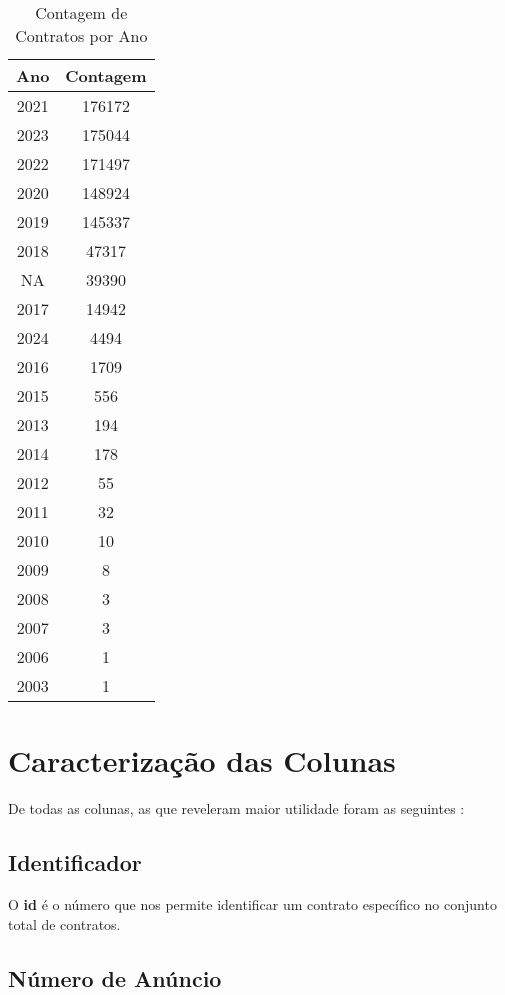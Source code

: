 \begin{table}[H]
	\centering
	\begin{tabular}{|c|c|}
		\toprule
		Ano & Contagem \\
		\midrule
		2021 & 176172 \\  \hline
		2023 & 175044 \\ \hline
		2022 & 171497 \\ \hline
		2020 & 148924 \\ \hline
		2019 & 145337 \\ \hline
		2018 & 47317 \\ \hline
		NA   & 39390 \\ \hline
		2017 & 14942 \\ \hline
		2024 & 4494 \\ \hline
		2016 & 1709 \\ \hline
		2015 & 556 \\ \hline
		2013 & 194 \\ \hline
		2014 & 178 \\ \hline
		2012 & 55 \\ \hline
		2011 & 32 \\ \hline
		2010 & 10 \\ \hline
		2009 & 8 \\ \hline
		2008 & 3 \\ \hline
		2007 & 3 \\ \hline
		2006 & 1 \\ \hline
		2003 & 1 \\ 
		\bottomrule
	\end{tabular}
	\caption{Contagem de Contratos por Ano}
\end{table}



\section{Caracterização das Colunas}

De todas as colunas, as que reveleram maior utilidade foram as seguintes : 


	
\subsection{Identificador}

O \textbf{id} é o número que nos permite identificar um contrato específico no conjunto total de contratos. 

\subsection{Número de Anúncio}

